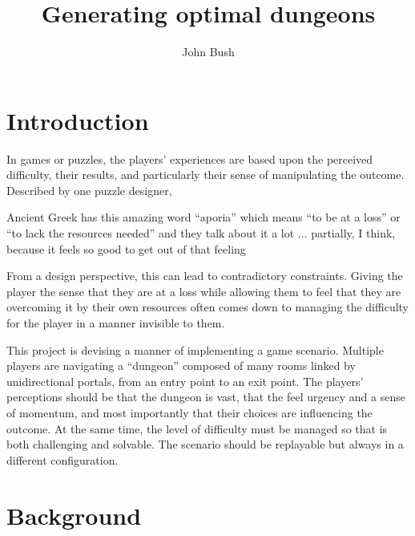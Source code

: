 \documentclass[landscape, a0, final]{a0poster}
\title{Generating optimal dungeons}
\author{John Bush}
\begin{document}
 


\begin{minipage}{0.25\linewidth}
\centering 
\begin{minipage}{0.9\linewidth} 

\section{Introduction} 

In games or puzzles, the players' experiences are based upon the perceived difficulty, their results, and particularly their sense of manipulating the outcome.  Described by one puzzle designer\footnotemark , 
    \begin{displayquote} 
        Ancient Greek has this amazing word ``aporia'' which means ``to be at a loss'' or ``to lack the resources needed'' and they talk about it a lot ... partially, I think, because it feels so good to get out of that feeling
    \end{displayquote} 
    From a design perspective, this can lead to contradictory constraints.  Giving the player the sense that they are at a loss while allowing them to feel that they are overcoming it by their own resources often comes down to managing the difficulty for the player in a manner invisible to them. 

This project is devising a manner of implementing a game scenario.  Multiple players are navigating a ``dungeon'' composed of many rooms linked by unidirectional portals, from an entry point to an exit point.  The players' perceptions should be that the dungeon is vast, that the feel urgency and a sense of momentum, and most importantly that their choices are influencing the outcome.  At the same time, the level of difficulty must be managed so that is both challenging and solvable.  The scenario should be replayable but always in a different configuration.

\section{Background} 


\end{minipage}
\end{minipage}
\end{document}
